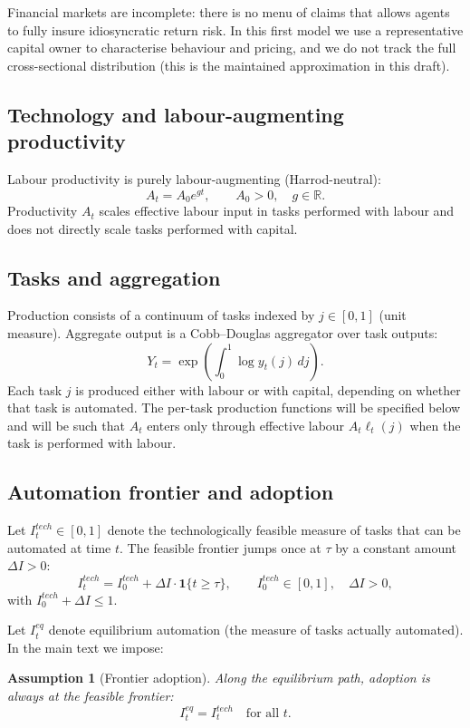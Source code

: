 \documentclass{article}
\newtheorem{assumption}{Assumption}
\begin{document}
Financial markets are incomplete: there is no menu of claims that allows agents to fully insure idiosyncratic return risk. In this first model we use a representative capital owner to characterise behaviour and pricing, and we do not track the full cross-sectional distribution (this is the maintained approximation in this draft).

\subsection{Technology and labour-augmenting productivity}

Labour productivity is purely labour-augmenting (Harrod-neutral):
$$
A_t = A_0 e^{g t},
\qquad A_0>0,\quad g \in \mathbb{R}.
$$
Productivity $A_t$ scales effective labour input in tasks performed with labour and does not directly scale tasks performed with capital.

\subsection{Tasks and aggregation}

Production consists of a continuum of tasks indexed by $j \in [0,1]$ (unit measure). Aggregate output is a Cobb--Douglas aggregator over task outputs:
$$
Y_t = \exp\left(\int_0^1 \log y_t(j)\,dj\right).
$$
Each task $j$ is produced either with labour or with capital, depending on whether that task is automated. The per-task production functions will be specified below and will be such that $A_t$ enters only through effective labour $A_t \ell_t(j)$ when the task is performed with labour.

\subsection{Automation frontier and adoption}

Let $I^{tech}_t \in [0,1]$ denote the technologically feasible measure of tasks that can be automated at time $t$. The feasible frontier jumps once at $\tau$ by a constant amount $\Delta I>0$:
$$
I^{tech}_t = I^{tech}_0 + \Delta I \cdot \mathbf{1}\{t \ge \tau\},
\qquad I^{tech}_0 \in [0,1],\quad \Delta I>0,
$$
with $I^{tech}_0+\Delta I \le 1$.

Let $I^{eq}_t$ denote equilibrium automation (the measure of tasks actually automated). In the main text we impose:

\begin{assumption}[Frontier adoption]
Along the equilibrium path, adoption is always at the feasible frontier:
$$
I^{eq}_t = I^{tech}_t \quad \text{for all } t.
$$
\end{assumption}
\end{document}
